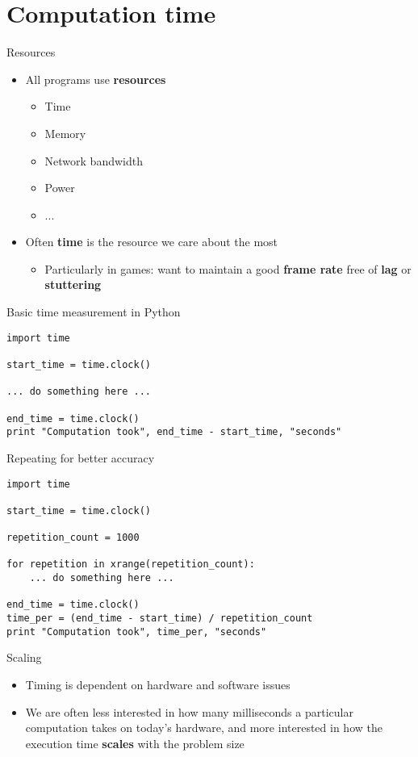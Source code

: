 \part{Computation time}
\frame{\partpage}

\begin{frame}{Resources}
	\begin{itemize}
		\pause\item All programs use \textbf{resources}
			\begin{itemize}
				\pause\item Time
				\pause\item Memory
				\pause\item Network bandwidth
				\pause\item Power
				\pause\item ...
			\end{itemize}
		\pause\item Often \textbf{time} is the resource we care about the most
			\begin{itemize}
				\pause\item Particularly in games:
					want to maintain a good \textbf{frame rate}
					free of \textbf{lag} or \textbf{stuttering}
			\end{itemize}
	\end{itemize}
\end{frame}

\begin{frame}[fragile]{Basic time measurement in Python}
	\begin{lstlisting}
import time

start_time = time.clock()

... do something here ...

end_time = time.clock()
print "Computation took", end_time - start_time, "seconds"
	\end{lstlisting}
\end{frame}

\begin{frame}[fragile]{Repeating for better accuracy}
	\begin{lstlisting}
import time

start_time = time.clock()

repetition_count = 1000

for repetition in xrange(repetition_count):
    ... do something here ...

end_time = time.clock()
time_per = (end_time - start_time) / repetition_count
print "Computation took", time_per, "seconds"
	\end{lstlisting}
\end{frame}

\begin{frame}{Scaling}
	\begin{itemize}
		\pause\item Timing is dependent on hardware and software issues
		\pause\item We are often less interested in how many milliseconds a particular computation takes on today's hardware, and more interested in how the execution time \textbf{scales} with the problem size
	\end{itemize}
\end{frame}
